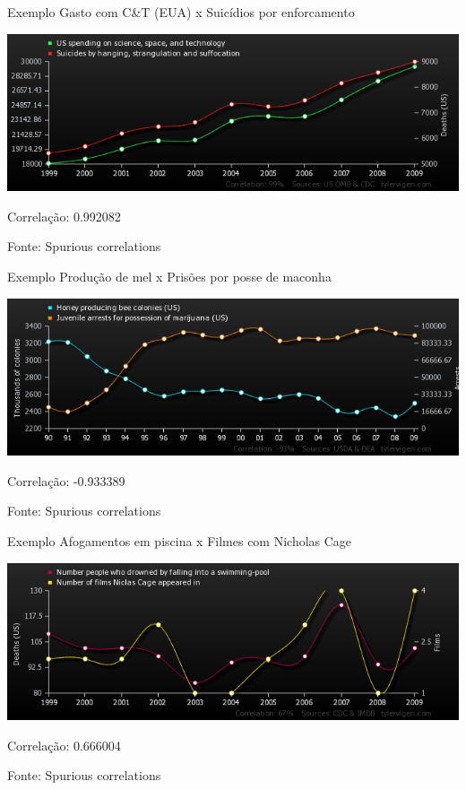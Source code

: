 \documentclass{beamer}
\begin{document}

\begin{frame}{\scriptsize Exemplo}
  \scriptsize
  Gasto com C\&T (EUA) x Suicídios por enforcamento
  \bigskip

  \includegraphics[width=\textwidth]{Cap17/us-spending-on-science-space-and-technology_suicides-by-hanging-strangulation-and-suffocation}

  \bigskip
  Correlação: 0.992082

  \vfill
  \hfill \tiny Fonte: Spurious correlations
\end{frame}

\begin{frame}{\scriptsize Exemplo}
  \scriptsize
  Produção de mel x Prisões por posse de maconha
  \bigskip

  \includegraphics[width=\textwidth]{Cap17/honey-producing-bee-colonies-us_juvenile-arrests-for-possession-of-marijuana-us}

  \bigskip
  Correlação: -0.933389

  \vfill
  \hfill \tiny Fonte: Spurious correlations
\end{frame}

\begin{frame}{\scriptsize Exemplo}
  \scriptsize
  Afogamentos em piscina x Filmes com Nicholas Cage
  \bigskip

  \includegraphics[width=\textwidth]{Cap17/number-people-who-drowned-by-falling-into-a-swimming-pool_number-of-films-niclas-cage-appeared-in}

  \bigskip
  Correlação: 0.666004

  \vfill
  \hfill \tiny Fonte: Spurious correlations
\end{frame}
\end{document}
